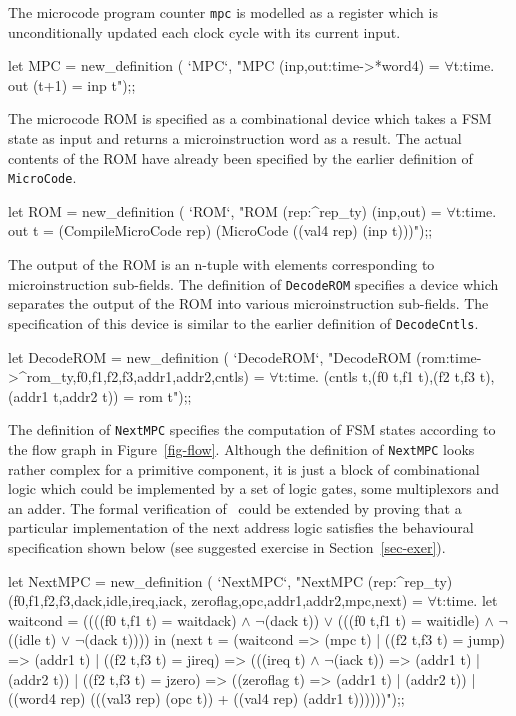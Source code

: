 The microcode program counter \verb"mpc" is
modelled as a register which is
unconditionally updated each clock cycle with its current input.

\begintt
let MPC = new_definition (
  `MPC`,
  "MPC (inp,out:time->*word4) = \(\forall\)t:time. out (t+1) = inp t");;
\endtt

The microcode ROM is specified as a
combinational device which takes a FSM state
as input and returns a microinstruction word as a result.
The actual contents of the ROM have already been specified
by the earlier definition of \verb"MicroCode".

\begintt
let ROM = new_definition (
  `ROM`,
  "ROM (rep:^rep_ty) (inp,out) =
    \(\forall\)t:time.
      out t = (CompileMicroCode rep) (MicroCode ((val4 rep) (inp t)))");;
\endtt

The output of the ROM is an n-tuple with elements corresponding
to microinstruction sub-fields.
The definition of \verb"DecodeROM" specifies a device which
separates the output of the ROM into various microinstruction sub-fields.
The specification of this device is similar to the
earlier definition of \verb"DecodeCntls".

\begintt
let DecodeROM = new_definition (
  `DecodeROM`,
  "DecodeROM (rom:time->^rom_ty,f0,f1,f2,f3,addr1,addr2,cntls) =
    \(\forall\)t:time. (cntls t,(f0 t,f1 t),(f2 t,f3 t),(addr1 t,addr2 t)) = rom t");;
\endtt

The definition of \verb"NextMPC" specifies the computation of FSM
states according to the flow graph in Figure~\ref{fig-flow}.
Although the definition of \verb"NextMPC" looks rather complex
for a primitive component, it is just a block of combinational logic
which could be implemented by a set of logic gates, some multiplexors and
an adder.
The formal verification of \Tamarack\ could be extended by
proving that a particular implementation of the next address logic
satisfies the behavioural specification shown below
(see suggested exercise in Section~\ref{sec-exer}).

\begintt
let NextMPC = new_definition (
  `NextMPC`,
  "NextMPC (rep:^rep_ty)
    (f0,f1,f2,f3,dack,idle,ireq,iack,
     zeroflag,opc,addr1,addr2,mpc,next) =
    \(\forall\)t:time.
      let waitcond =
        ((((f0 t,f1 t) = waitdack) \(\wedge\) \(\neg\)(dack t)) \(\vee\)
         (((f0 t,f1 t) = waitidle) \(\wedge\) \(\neg\)((idle t) \(\vee\) \(\neg\)(dack t)))) in
      (next t =
        (waitcond => (mpc t) |
         ((f2 t,f3 t) = jump) => (addr1 t) |
         ((f2 t,f3 t) = jireq) =>
           (((ireq t) \(\wedge\) \(\neg\)(iack t)) => (addr1 t) | (addr2 t)) |
         ((f2 t,f3 t) = jzero) =>
           ((zeroflag t) => (addr1 t) | (addr2 t)) |
           ((word4 rep)
             (((val3 rep) (opc t)) + ((val4 rep) (addr1 t))))))");;
\endtt

